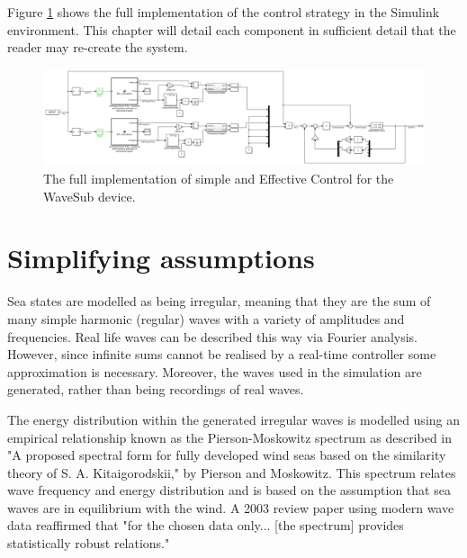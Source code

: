 \documentclass{report}
\begin{document}
Figure \ref{fig:fullControl} shows the full implementation of the control strategy in the Simulink environment. This chapter will detail each component in sufficient detail that the reader may re-create the system.

\begin{figure}
\centering
\label{fig:fullControl}
\includegraphics[scale=0.5]{graphics/fullControlSystem}
\caption{The full implementation of simple and Effective Control for the WaveSub device.}
\end{figure}




\section{Simplifying assumptions}
\label{section: assumptions}

Sea states are modelled as being irregular, meaning that they are the sum of many simple harmonic (regular) waves with a variety of amplitudes and frequencies. Real life waves can be described this way via Fourier analysis. However, since infinite sums cannot be realised by a real-time controller some approximation is necessary. Moreover, the waves used in the simulation are generated, rather than being recordings of real waves.

The energy distribution within the generated irregular waves is modelled using an empirical relationship known as the Pierson-Moskowitz spectrum as described in "A proposed spectral form for fully developed wind seas based on the similarity theory of S. A. Kitaigorodskii," by Pierson and Moskowitz\cite{OGPM}. This spectrum relates wave frequency and energy distribution and is based on the assumption that sea waves are in equilibrium with the wind. A 2003 review paper using modern wave data reaffirmed that "for the chosen data only... [the spectrum] provides statistically robust relations."\cite{PMReview}
\end{document}
